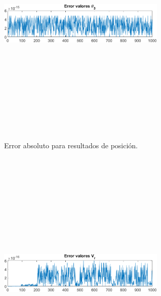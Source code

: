 \documentclass[12pt]{article}
\begin{document}
\begin{multicols}{2}
\begin{figure} [H]
    \end{figure}
        \vspace{-25pt}
        \begin{figure} [H]
        \centerline{\includegraphics[width=8cm, height=12cm,keepaspectratio]{Error/Error theta3.png}}
        \caption{Error absoluto para resultados de posición.}
        \label{}
    \end{figure}
\begin{figure} [H]
        \centerline{\includegraphics[width=8cm, height=12cm,keepaspectratio]{Error/Error Vr.png}}

\end{figure}
\end{multicols}
\end{document}
